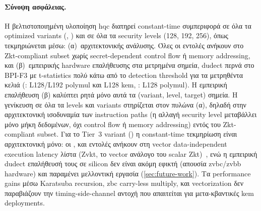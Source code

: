 \paragraph{Σύνοψη ασφάλειας.}
Η βελτιστοποιημένη υλοποίηση \gls{hqc} διατηρεί constant-time συμπεριφορά σε
όλα τα optimized variants (, )
και σε όλα τα security levels (128, 192, 256), όπως τεκμηριώνεται μέσω:
(α)~αρχιτεκτονικής ανάλυσης. Όλες οι εντολές ανήκουν στο Zkt-compliant
subset χωρίς secret-dependent control flow ή memory addressing,
και (β)~εμπειρικής hardware επαλήθευσης στα μετρημένα σημεία, dudect περνά στο BPI-F3 με
t-statistics πολύ κάτω από το detection threshold για τα μετρηθέντα κελιά (: L128/L192 polymul και L128 \gls{kem}, : L128 polymul). Η εμπειρική επαλήθευση (β) καλύπτει ρητά μόνο αυτά τα (variant, level, target) σημεία. Η γενίκευση σε όλα τα levels και variants στηρίζεται στον πυλώνα (α), δηλαδή στην αρχιτεκτονική ισοδυναμία των instruction paths (η αλλαγή security level μεταβάλλει μόνο μήκη δεδομένων, όχι control flow ή memory addressing) εντός του Zkt-compliant subset. Για το Tier~3 variant () η constant-time τεκμηρίωση είναι αρχιτεκτονική μόνο: οι \vclmul, \vclmulh και \vror εντολές ανήκουν στη vector data-independent execution latency λίστα (Zvkt, το vector ανάλογο του scalar Zkt)~\cite{RISCV-crypto-spec}, ενώ η εμπειρική dudect επαλήθευσή τους σε silicon δεν είναι ακόμη εφικτή (απουσία \gls{zvbc}/\gls{zvbb} hardware) και παραμένει μελλοντική εργασία (\cref{sec:future-work}). Τα performance gains
μέσω Karatsuba recursion, \gls{zbc} carry-less multiply, και \RVV vectorization
δεν παραβιάζουν την timing-side-channel αντοχή που απαιτείται για
μετα-κβαντικές \gls{kem} deployments.
\fi

